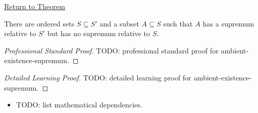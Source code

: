 \newpage
{}
\label{prf:ambient-existence-supremum}

\begin{remark*}[Return]
\hyperref[thm:ambient-existence-supremum]{Return to Theorem}
\end{remark*}

\begin{theorem*}
There are ordered sets $S\subseteq S'$ and a subset $A\subseteq S$ such that $A$ has a supremum relative to $S'$ but has no supremum relative to $S$.
\end{theorem*}

\begin{proof}[Professional Standard Proof]
\LRAProofBodyStart
TODO: professional standard proof for ambient-existence-supremum.
\end{proof}

\begin{proof}[Detailed Learning Proof]
\LRAProofBodyStart
TODO: detailed learning proof for ambient-existence-supremum.
\end{proof}

\begin{remark*}
\end{remark*}

\begin{dependencies}
\begin{itemize}
  \item TODO: list mathematical dependencies.
\end{itemize}
\end{dependencies}

\clearpage
